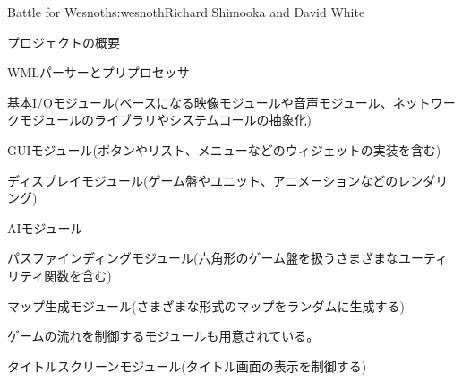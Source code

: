 \begin{aosachapter}{Battle for Wesnoth}{s:wesnoth}{Richard Shimooka and David White}
\begin{aosasect1}{プロジェクトの概要}
\begin{aosaitemize}

  \item WMLパーサーとプリプロセッサ

  \item 基本I/Oモジュール(ベースになる映像モジュールや音声モジュール、ネットワークモジュールのライブラリやシステムコールの抽象化)

  \item GUIモジュール(ボタンやリスト、メニューなどのウィジェットの実装を含む)

  \item ディスプレイモジュール(ゲーム盤やユニット、アニメーションなどのレンダリング)

  \item AIモジュール

  \item パスファインディングモジュール(六角形のゲーム盤を扱うさまざまなユーティリティ関数を含む)

  \item マップ生成モジュール(さまざまな形式のマップをランダムに生成する)

\end{aosaitemize}

ゲームの流れを制御するモジュールも用意されている。

\begin{aosaitemize}

  \item タイトルスクリーンモジュール(タイトル画面の表示を制御する)


\end{aosaitemize}
\end{aosasect1}
\end{aosachapter}
